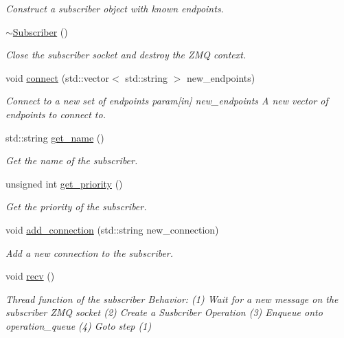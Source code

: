 \begin{DoxyCompactItemize}
\begin{DoxyCompactList}\small\item\em Construct a subscriber object with known endpoints. \end{DoxyCompactList}\item 
\hyperlink{classzcm_1_1Subscriber_a6f647c7d9f952e07b22b3aa4b63778e7}{$\sim$\+Subscriber} ()
\begin{DoxyCompactList}\small\item\em Close the subscriber socket and destroy the Z\+MQ context. \end{DoxyCompactList}\item 
void \hyperlink{classzcm_1_1Subscriber_a542674cff70f8d22b490a6b4a87476fe}{connect} (std\+::vector$<$ std\+::string $>$ new\+\_\+endpoints)
\begin{DoxyCompactList}\small\item\em Connect to a new set of endpoints param\mbox{[}in\mbox{]} new\+\_\+endpoints A new vector of endpoints to connect to. \end{DoxyCompactList}\item 
std\+::string \hyperlink{classzcm_1_1Subscriber_a013f450dff91644668a84cdb65d51b53}{get\+\_\+name} ()
\begin{DoxyCompactList}\small\item\em Get the name of the subscriber. \end{DoxyCompactList}\item 
unsigned int \hyperlink{classzcm_1_1Subscriber_a67427b093be45c979b4f091e6a9831ab}{get\+\_\+priority} ()
\begin{DoxyCompactList}\small\item\em Get the priority of the subscriber. \end{DoxyCompactList}\item 
void \hyperlink{classzcm_1_1Subscriber_acbfe7d4ab1b4a6fad5d9a7cbd3b8ee09}{add\+\_\+connection} (std\+::string new\+\_\+connection)
\begin{DoxyCompactList}\small\item\em Add a new connection to the subscriber. \end{DoxyCompactList}\item 
void \hyperlink{classzcm_1_1Subscriber_a3e270344beb730e009d48b04792e5526}{recv} ()
\begin{DoxyCompactList}\small\item\em Thread function of the subscriber Behavior\+: (1) Wait for a new message on the subscriber Z\+MQ socket (2) Create a Susbcriber Operation (3) Enqueue onto operation\+\_\+queue (4) Goto step (1) \end{DoxyCompactList}\item 

\end{DoxyCompactItemize}
